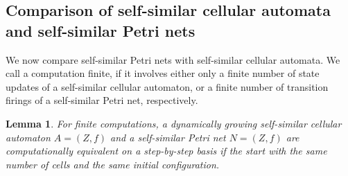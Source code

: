 \documentclass[pre,showpacs,showkeys,preprint]{revtex4}
\newtheorem{lemma}{Lemma}
\theoremstyle{definition}
\begin{document}
\subsection{Comparison of self-similar cellular automata and self-similar Petri nets}

We now compare self-similar Petri nets with self-similar cellular automata.
We call a computation finite, if it involves either only a finite number of state updates of a self-similar cellular automaton, or
a finite number of transition firings of a self-similar Petri net, respectively.
\begin{lemma}
\label{lemma:comp-equivalence}
For finite computations, a dynamically growing self-similar cellular automaton $A = (Z, f)$ and a self-similar Petri net $N = (Z, f)$ are computationally
equivalent on a step-by-step basis if the start with the same number of cells and the same initial configuration.
\end{lemma}
\end{document}
